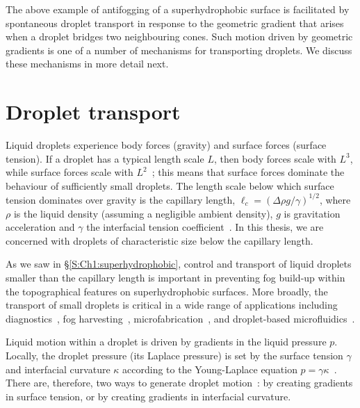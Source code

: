 The above example of antifogging of a superhydrophobic surface is facilitated by spontaneous droplet transport in response to the geometric gradient that arises when a droplet bridges two neighbouring cones. Such motion driven by geometric gradients is  one of a number of mechanisms for transporting droplets. We discuss these mechanisms in more detail next.

\section{Droplet transport}
Liquid droplets experience body forces (gravity) and surface forces (surface tension). If a droplet has a typical length scale $L$, then body forces scale with $L^3$, while surface forces scale with $L^2$~\citep{deGennes2004}; this means that surface forces dominate the behaviour of sufficiently small droplets. The length scale below which surface tension dominates over gravity is the capillary length, $\ell_c = (\Delta \rho g/\gamma)^{1/2}$, where $\rho$ is the liquid density (assuming a negligible ambient density), $g$ is gravitation acceleration and $\gamma$ the interfacial tension coefficient~\citep{deGennes2004}. In this thesis, we are concerned with droplets of characteristic size below the capillary length.


As we saw in \S\ref{S:Ch1:superhydrophobic}, control and transport of liquid droplets smaller than the capillary length is important in preventing fog build-up within the topographical features on superhydrophobic surfaces. More broadly, the transport of small droplets is critical in a wide range of applications including diagnostics~\citep{Yager2006Nature}, fog harvesting~\citep{Andrews2011Langmuir}, microfabrication~\citep{Srinivasarao2001Science}, and droplet-based microfluidics~\citep{Squires2005RevModPhys}.


Liquid motion within a droplet is driven by gradients in the liquid pressure $p$. Locally, the droplet pressure (its Laplace pressure) is set by the surface tension $\gamma$ and interfacial curvature $\kappa$ according to the Young-Laplace equation $p = \gamma \kappa$~\citep{Laplace1799,Young1805PhilosTrans}. There are, therefore, two ways to generate droplet motion~\citep{Scriven1960Nature}: by creating gradients in surface tension, or by creating gradients in interfacial curvature.

